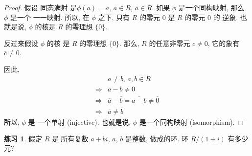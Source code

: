 \documentclass[utf8]{ctexbook}
\theoremstyle{definition}
\newtheorem{exercise}{练习}[section]
\begin{document}
\begin{proof}
假设 同态满射 是$\phi(a) = \overline{a}$, $a \in R$, $\overline{a} \in \overline{R}$. 如果 $\phi$ 是一个同构映射, 那么 $\phi$ 是一个 一一映射. 所以, 在 $\phi$ 之下, 只有 $R$ 的零元 $0$ 是 $\overline{R}$ 的零元 $\overline{0}$ 的 逆象. 也就是说, $\phi$ 的核是 $R$ 的零理想 $\{0\}$.

反过来假设 $\phi$ 的核 是 $R$ 的零理想 $\{ 0 \}$. 那么, $R$ 的任意非零元 $c \neq 0$, 它的象有 $\overline{c} \neq 0$. 

因此,
\begin{align*}
& a \neq b,\, a, b \in R \\
\Longrightarrow & a - b \neq 0 \\
\Longrightarrow & \overline{a} - \overline{b} = \overline{a - b} \neq \overline{0} \\
\Longrightarrow & \overline{a} \neq \overline{b}
\end{align*}
所以, $\phi$ 是 一个单射 (injective). 也就是说, $\phi$ 是一个同构映射 (isomorphism).
\end{proof}


\begin{exercise}\label{exercise_quotient_ring_R_1_i}
假定 $R$ 是 所有复数 $a + b i $, $a$, $b$ 是整数, 做成的环. 环 $R/(1+i)$ 有多少元?
\end{exercise}
\end{document}
